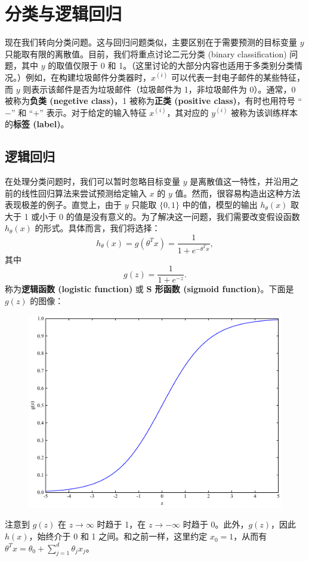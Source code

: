 \chapter{分类与逻辑回归}

现在我们转向分类问题。这与回归问题类似，主要区别在于需要预测的目标变量 $y$ 只能取有限的离散值。目前，我们将重点讨论二元分类 (binary classification) 问题，其中 $y$ 的取值仅限于 0 和 1。（这里讨论的大部分内容也适用于多类别分类情况。）例如，在构建垃圾邮件分类器时，$x^{(i)}$ 可以代表一封电子邮件的某些特征，而 $y$ 则表示该邮件是否为垃圾邮件（垃圾邮件为 1，非垃圾邮件为 0）。通常，0 被称为\textbf{负类 (negetive class)}，1 被称为\textbf{正类 (positive class)}，有时也用符号 “$-$” 和 “$+$” 表示。对于给定的输入特征 $x^{(i)}$，其对应的 $y^{(i)}$ 被称为该训练样本的\textbf{标签 (label)}。

\section{逻辑回归}\label{sec:2.1}

在处理分类问题时，我们可以暂时忽略目标变量 $y$ 是离散值这一特性，并沿用之前的线性回归算法来尝试预测给定输入 $x$ 的 $y$ 值。然而，很容易构造出这种方法表现极差的例子。直觉上，由于 $y$ 只能取 $\{0, 1\}$ 中的值，模型的输出 $h_\theta(x)$ 取大于 1 或小于 0 的值是没有意义的。为了解决这一问题，我们需要改变假设函数 $h_\theta(x)$ 的形式。具体而言，我们将选择：
\[
    h_\theta(x) = g(\theta^T x) = \frac{1}{1+e^{-\theta^T x}},
\]
其中
\[
    g(z) = \frac{1}{1+e^{-z}}.
\]
称为\textbf{逻辑函数 (logistic function)} 或 \textbf{S 形函数 (sigmoid function)}。下面是 $g(z)$ 的图像：

\begin{figure}[H]
    \centering
    \includegraphics[width=0.5\linewidth]{figs/sigmoid.pdf}
    \label{fig:sigmoid}
\end{figure}

注意到 $g(z)$ 在 $z \to \infty$ 时趋于 1，在 $z \to -\infty$ 时趋于 0。此外，$g(z)$，因此 $h(x)$，始终介于 0 和 1 之间。和之前一样，这里约定 $x_0 = 1$，从而有 $\theta^T x = \theta_0 + \sum_{j=1}^d \theta_j x_j$。

